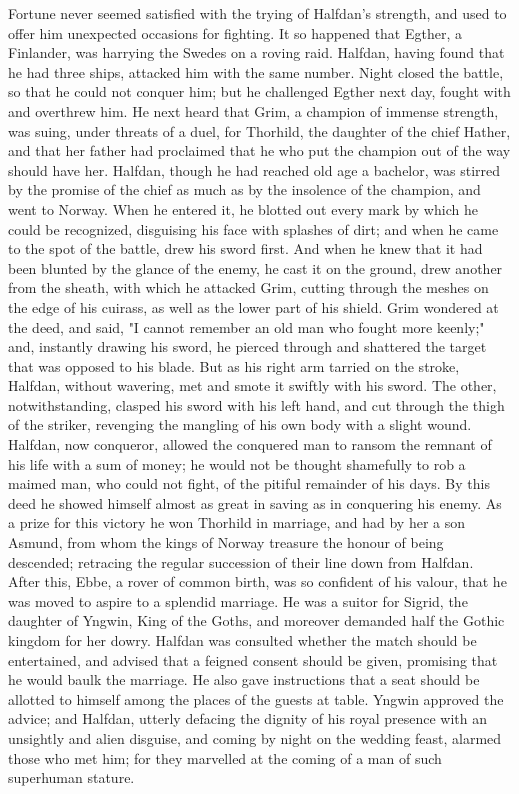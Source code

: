 \documentclass[10pt,a4paper]{report}
\begin{document}
Fortune never seemed satisfied with the trying of Halfdan's strength, and used to offer him unexpected occasions for fighting. It so happened that Egther, a Finlander, was harrying the Swedes on a roving raid. Halfdan, having found that he had three ships, attacked him with the same number. Night closed the battle, so that he could not conquer him; but he challenged Egther next day, fought with and overthrew him. He next heard that Grim, a champion of immense strength, was suing, under threats of a duel, for Thorhild, the daughter of the chief Hather, and that her father had proclaimed that he who put the champion out of the way should have her. Halfdan, though he had reached old age a bachelor, was stirred by the promise of the chief as much as by the insolence of the champion, and went to Norway. When he entered it, he blotted out every mark by which he could be recognized, disguising his face with splashes of dirt; and when he came to the spot of the battle, drew his sword first. And when he knew that it had been blunted by the glance of the enemy, he cast it on the ground, drew another from the sheath, with which he attacked Grim, cutting through the meshes on the edge of his cuirass, as well as the lower part of his shield. Grim wondered at the deed, and said, "I cannot remember an old man who fought more keenly;" and, instantly drawing his sword, he pierced through and shattered the target that was opposed to his blade. But as his right arm tarried on the stroke, Halfdan, without wavering, met and smote it swiftly with his sword. The other, notwithstanding, clasped his sword with his left hand, and cut through the thigh of the striker, revenging the mangling of his own body with a slight wound. Halfdan, now conqueror, allowed the conquered man to ransom the remnant of his life with a sum of money; he would not be thought shamefully to rob a maimed man, who could not fight, of the pitiful remainder of his days. By this deed he showed himself almost as great in saving as in conquering his enemy. As a prize for this victory he won Thorhild in marriage, and had by her a son Asmund, from whom the kings of Norway treasure the honour of being descended; retracing the regular succession of their line down from Halfdan.\\

After this, Ebbe, a rover of common birth, was so confident of his valour, that he was moved to aspire to a splendid marriage. He was a suitor for Sigrid, the daughter of Yngwin, King of the Goths, and moreover demanded half the Gothic kingdom for her dowry. Halfdan was consulted whether the match should be entertained, and advised that a feigned consent should be given, promising that he would baulk the marriage. He also gave instructions that a seat should be allotted to himself among the places of the guests at table. Yngwin approved the advice; and Halfdan, utterly defacing the dignity of his royal presence with an unsightly and alien disguise, and coming by night on the wedding feast, alarmed those who met him; for they marvelled at the coming of a man of such superhuman stature.\\
\end{document}
